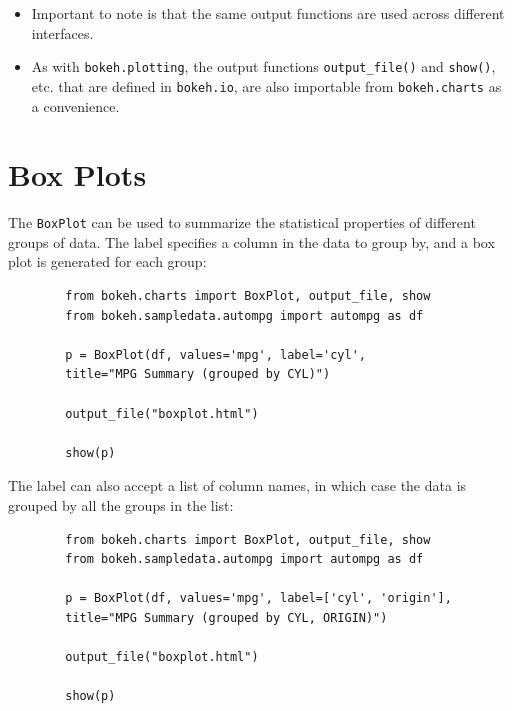 \documentclass[12pt, a4paper]{report}
\begin{document}
\newpage

\begin{itemize}
\item Important to note is that the same output functions are used across different interfaces. 
\item As with \texttt{bokeh.plotting}, the output functions \texttt{output\_file()} and \texttt{show()}, etc. that are defined in \texttt{bokeh.io}, are also importable from \texttt{bokeh.charts} as a convenience.
\end{itemize}


\newpage
\section*{Box Plots}
The \texttt{BoxPlot} can be used to summarize the statistical properties of different groups of data. The label specifies a column in the data to group by, and a box plot is generated for each group:
{
	\large
	\begin{framed}
		\begin{verbatim}
		from bokeh.charts import BoxPlot, output_file, show
		from bokeh.sampledata.autompg import autompg as df
		
		p = BoxPlot(df, values='mpg', label='cyl',
		title="MPG Summary (grouped by CYL)")
		
		output_file("boxplot.html")
		
		show(p)
		\end{verbatim}
	\end{framed}
}
\newpage
\noindent The label can also accept a list of column names, in which case the data is grouped by all the groups in the list:
{
	\large
	\begin{framed}
		\begin{verbatim}
		from bokeh.charts import BoxPlot, output_file, show
		from bokeh.sampledata.autompg import autompg as df
		
		p = BoxPlot(df, values='mpg', label=['cyl', 'origin'],
		title="MPG Summary (grouped by CYL, ORIGIN)")
		
		output_file("boxplot.html")
		
		show(p)
		\end{verbatim}
	\end{framed}
}
\newpage
\end{document}
